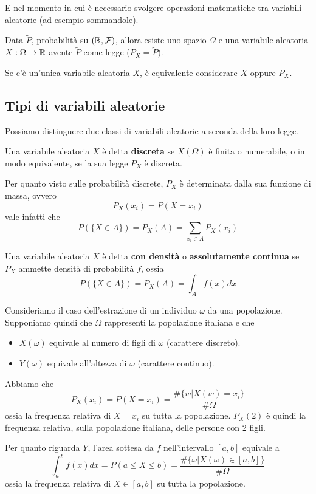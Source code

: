 E nel momento in cui è necessario svolgere operazioni matematiche tra variabili aleatorie (ad
esempio sommandole).

\begin{observation}
	Data $\tilde{P}$, probabilità su $(\mathbb{R}, \mathcal{F})$, allora esiste uno spazio $\Omega$ e una variabile
	aleatoria $X : \Omega \to \mathbb{R}$ avente $\tilde{P}$ come legge ($P_X = \tilde{P})$.
\end{observation}

\begin{observation}
	Se c'è un'unica variabile aleatoria $X$, è equivalente considerare $X$ oppure $P_X$.
\end{observation}

\subsection{Tipi di variabili aleatorie}
Possiamo distinguere due classi di variabili aleatorie a seconda della loro legge.

\begin{definition}
	Una variabile aleatoria $X$ è detta \textbf{discreta} se $X(\Omega)$ è finita o numerabile, o
	in modo equivalente, se la sua legge $P_X$ è discreta.
\end{definition}

Per quanto visto sulle probabilità discrete, $P_X$ è determinata dalla sua funzione di massa,
ovvero
\[ P_X (x_i) = P(X = x_i) \]
vale infatti che
\[ P(\{X \in A\}) = P_X (A) = \sum_{x_i \in A} P_X (x_i) \]

\begin{definition}
	Una variabile aleatoria $X$ è detta \textbf{con densità} o \textbf{assolutamente continua} se
	$P_X$ ammette densità di probabilità $f$, ossia
	\[ P(\{X \in A\}) = P_X (A) = \int_A f(x) dx \]
\end{definition}

\begin{example}
	Consideriamo il caso dell'estrazione di un individuo $\omega$ da una popolazione. Supponiamo
	quindi che $\Omega$ rappresenti la popolazione italiana e che
	\begin{itemize}
		\item $X(\omega)$ equivale al numero di figli di $\omega$ (carattere discreto).
		\item $Y(\omega)$ equivale all'altezza di $\omega$ (carattere continuo).
	\end{itemize}
	Abbiamo che
	\[ P_X(x_i) = P(X = x_i) = \frac{\# \{ w | X(w) = x_i\} }{\# \Omega} \]
	ossia la frequenza relativa di $X = x_i$ su tutta la popolazione. $P_X(2)$ è quindi la
	frequenza relativa, sulla popolazione italiana, delle persone con 2 figli.

	Per quanto riguarda $Y$, l'area sottesa da $f$ nell'intervallo $[a,b]$ equivale a
	\[
		\int_a^b f(x) dx = P (a \leq X \leq b)
		= \frac{\# \{ \omega | X(\omega) \in [a,b] \}}{\# \Omega}
	\]
	ossia la frequenza relativa di $X \in [a,b]$ su tutta la popolazione.
\end{example}